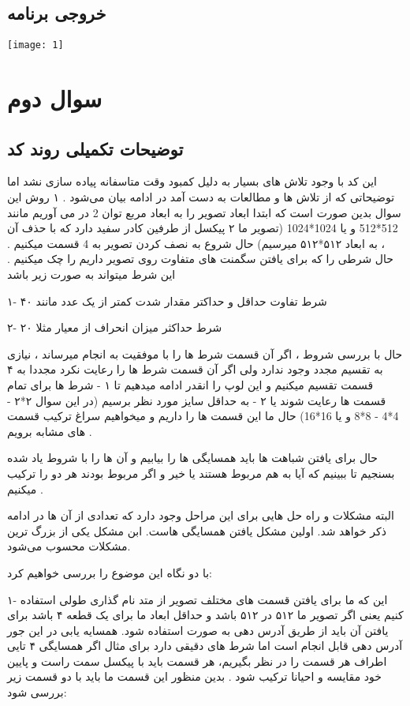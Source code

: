 \documentclass[12pt]{article}
\begin{document}
		\subsection{خروجی برنامه}
		
		\texttt{[image: 1]}\\

		\newpage
		
			\doublespacing
		\section{سوال دوم}
		\subsection{توضیحات تکمیلی روند کد}
		این کد با وجود تلاش های بسیار به دلیل کمبود وقت متاسفانه پیاده سازی نشد اما توضیحاتی که از تلاش ها و مطالعات به دست آمد در ادامه بیان می‌شود .
		۱ روش این سوال بدین صورت است که ابتدا ابعاد تصویر را به ابعاد مربع توان 2 در می آوریم مانند 512*512  و یا 1024*1024 (تصویر ما ۲ پیکسل از طرفین کادر سفید دارد که با حذف آن ، به ابعاد ۵۱۲*۵۱۲ میرسیم) حال شروع به نصف کردن تصویر به 4 قسمت میکنیم . حال شرطی را که برای یافتن سگمنت های متفاوت روی تصویر داریم را چک میکنیم . این شرط میتواند به صورت زیر باشد 
		
		۱- شرط تفاوت حداقل و حداکتر مقدار شدت کمتر از یک عدد مانند ۴۰ 
	
		۲- شرط حداکثر میزان انحراف از معیار مثلا ۲۰ 
		
		حال با بررسی شروط ، اگر آن قسمت شرط ها را با موفقیت به انجام میرساند ، نیازی به تقسیم مجدد وجود ندارد ولی اگر آن قسمت شرط ها را رعایت نکرد مجددا به ۴ قسمت تقسیم میکنیم و این لوپ را انقدر ادامه میدهیم تا ۱ - شرط ها برای تمام قسمت ها رعایت شوند یا ۲ - به حداقل سایز مورد نظر برسیم (در این سوال ۲*۲ - 4*4 - 8*8 و یا 16*16) 
		حال ما این قسمت ها را داریم و میخواهیم سراغ ترکیب قسمت های مشابه برویم . 
		
		حال برای یافتن شباهت ها باید همسایگی ها را بیابیم و آن ها را با شروط یاد شده بسنجیم تا ببینیم که آیا به هم مربوط هستند یا خیر و اگر مربوط بودند هر دو را ترکیب میکنیم .
		
		البته مشکلات و راه حل هایی برای این مراحل وجود دارد که تعدادی از آن ها در ادامه ذکر خواهد شد.
		اولین مشکل یافتن همسایگی هاست. ابن مشکل یکی از بزرگ ترین مشکلات محسوب می‌شود. 
		
		با دو نگاه این موضوع را بررسی خواهیم کرد:
		
		۱- این که ما برای یافتن قسمت های مختلف تصویر از متد نام گذاری طولی استفاده کنیم یعنی اگر تصویر ما ۵۱۲ در ۵۱۲ باشد و حداقل ابعاد ما برای یک قطعه ۴ باشد برای یافتن آن باید از طریق آدرس دهی به صورت 
		استفاده شود. همسایه یابی در این جور آدرس دهی قابل انجام است اما شرط های دقیقی دارد برای مثال اگر همسایگی ۴ تایی اطراف هر قسمت را در نظر بگیریم، هر قسمت باید با پیکسل سمت راست و پایین خود مقایسه و احیانا ترکیب شود . بدین منظور این قسمت ما باید با دو قسمت زیر بررسی شود:
		
\end{document}
